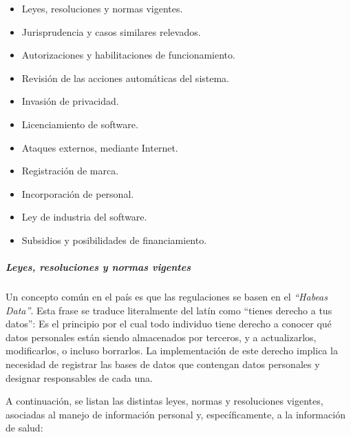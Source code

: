 \begin{itemize}
    \item Leyes, resoluciones y normas vigentes.
    \item Jurisprudencia y casos similares relevados.
    \item Autorizaciones y habilitaciones de funcionamiento.
    \item Revisión de las acciones automáticas del sistema.
    \item Invasión de privacidad.
    \item Licenciamiento de software.
    \item Ataques externos, mediante Internet.
    \item Registración de marca.
    \item Incorporación de personal.
    \item Ley de industria del software.
    \item Subsidios y posibilidades de financiamiento.
\end{itemize}


\subparagraph{Leyes, resoluciones y normas vigentes}
    
    Un concepto común en el país es que las regulaciones se basen en el \textit{``Habeas Data''}.
    Esta frase se traduce literalmente del latín como ``tienes derecho a tus datos'':
    Es el principio por el cual todo individuo tiene derecho a conocer qué datos personales están siendo almacenados por terceros, y a actualizarlos, modificarlos, o incluso borrarlos.
    La implementación de este derecho implica la necesidad de registrar las bases de datos que contengan datos personales y designar responsables de cada una.
    
    A continuación, se listan las distintas leyes, normas y resoluciones vigentes, asociadas al manejo de información personal y, específicamente, a la información de salud:
    
